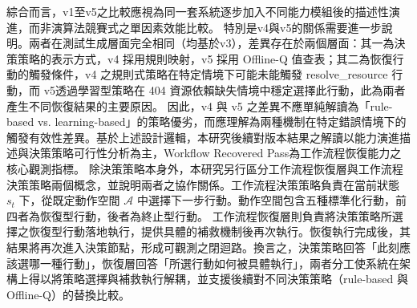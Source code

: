 \begin{ZhChapter}
\text 綜合而言，v1至v5之比較應視為同一套系統逐步加入不同能力模組後的描述性演進，而非演算法競賽式之單因素效能比較。 特別是v4與v5的關係需要進一步說明。兩者在測試生成層面完全相同（均基於v3），差異存在於兩個層面：其一為決策策略的表示方式，v4 採用規則映射，v5 採用 Offline-Q 值查表；其二為恢復行動的觸發條件，v4 之規則式策略在特定情境下可能未能觸發 resolve\_resource 行動，而 v5透過學習型策略在 404 資源依賴缺失情境中穩定選擇此行動，此為兩者產生不同恢復結果的主要原因。 因此，v4 與 v5 之差異不應單純解讀為「rule-based vs. learning-based」的策略優劣，而應理解為兩種機制在特定錯誤情境下的觸發有效性差異。基於上述設計邏輯，本研究後續對版本結果之解讀以能力演進描述與決策策略可行性分析為主，Workflow Recovered Pass為工作流程恢復能力之核心觀測指標。
\text 除決策策略本身外，本研究另行區分工作流程恢復層與工作流程決策策略兩個概念，並說明兩者之協作關係。工作流程決策策略負責在當前狀態 $s_t$ 下，從既定動作空間 $\mathcal{A}$ 中選擇下一步行動。動作空間包含五種標準化行動，前四者為恢復型行動，後者為終止型行動。 工作流程恢復層則負責將決策策略所選擇之恢復型行動落地執行，提供具體的補救機制後再次執行。恢復執行完成後，其結果將再次進入決策節點，形成可觀測之閉迴路。換言之，決策策略回答「此刻應該選哪一種行動」，恢復層回答「所選行動如何被具體執行」，兩者分工使系統在架構上得以將策略選擇與補救執行解耦，並支援後續對不同決策策略（rule-based 與 Offline-Q）的替換比較。


\end{ZhChapter}
